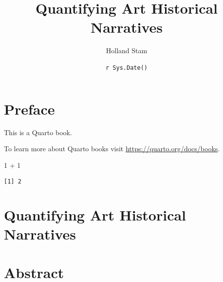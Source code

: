 \documentclass[
  letterpaper,
  DIV=11,
  numbers=noendperiod]{scrreprt}
\title{Quantifying Art Historical Narratives}
\author{Holland Stam}
\date{\texttt{r\ Sys.Date()}}
\newenvironment{Shaded}{\begin{snugshade}}{\end{snugshade}}
\newcommand{\DecValTok}[1]{\textcolor[rgb]{0.68,0.00,0.00}{#1}}
\newcommand{\SpecialCharTok}[1]{\textcolor[rgb]{0.37,0.37,0.37}{#1}}
\renewcommand*\contentsname{Table of contents}
\begin{document}
\maketitle

\renewcommand*\contentsname{Table of contents}
{
\hypersetup{linkcolor=}
\setcounter{tocdepth}{2}
\tableofcontents
}
\hypertarget{preface}{%
\chapter*{Preface}\label{preface}}

This is a Quarto book.

To learn more about Quarto books visit
\url{https://quarto.org/docs/books}.

\begin{Shaded}
\begin{Highlighting}[]
\DecValTok{1} \SpecialCharTok{+} \DecValTok{1}
\end{Highlighting}
\end{Shaded}

\begin{verbatim}
[1] 2
\end{verbatim}

\hypertarget{quantifying-art-historical-narratives}{%
\chapter{Quantifying Art Historical
Narratives}\label{quantifying-art-historical-narratives}}

\hypertarget{abstract}{%
\chapter{Abstract}\label{abstract}}
\end{document}
